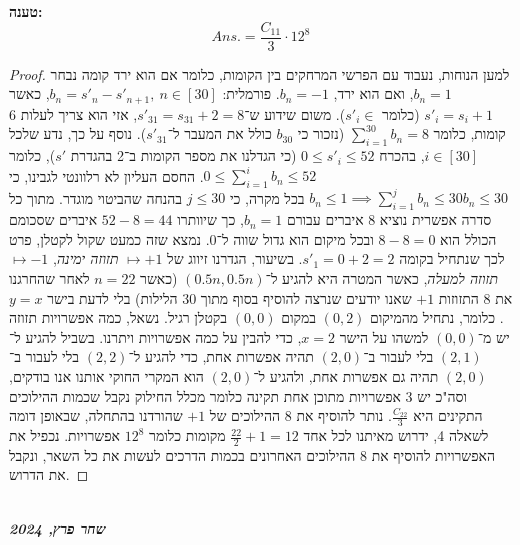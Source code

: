 \documentclass[]{article}
\newcommand\ndoc  {\dotfill \\ \vfil \hfil \textbf{\textit{שחר פרץ, 2024}} \hfil \vfil}
\newcommand\ans   {\mathit{Ans.}}
\begin{document}
	\textbf{טענה: }
	\[ \ans = \frac{C_{11}}{3} \cdot 12^{8} \]
	\begin{proof}
		למען הנוחות, נעבוד עם הפרשי המרחקים בין הקומות, כלומר אם הוא ירד קומה נבחר $b_n = 1$, ואם הוא ירד, $b_n = -1$. פורמלית: $b_n = s'_n - s'_{n + 1}, \ n \in [30]$, כאשר $s'_i = s_i + 1$ (כלומר $s'_i \in $). משום שידוע ש־$s'_{31} = s_{31} + 2 = 8$, אזי הוא צריך לעלות 6 קומות, כלומר $\sum_{i = 1}^{30} b_n = 8$ (נזכור כי $b_{30}$ כולל את המעבר ל־$s'_{31}$). נוסף על כך, נדע שלכל $i \in [30]$, בהכרח $0 \le s'_i \le 52$ (כי הגדלנו את מספר הקומות ב־2 בהגדרת $s'$), כלומר $0 \le \sum_{i = 1}^{i} b_n\le 52$. החסם העליון לא רלוונטי לגבינו, כי $b_n \le 1 \implies \sum_{i = 1}^{j} b_n \le 30 b_n \le 30$ בכל מקרה, כי $j \le 30$ בהנחה שהביטוי מוגדר. מתוך כל סדרה אפשרית נוציא $8$ איברים עבורם $b_n = 1$, כך שיוותרו $52 - 8 = 44$ איברים שסכומם הכולל הוא $8 - 8 = 0$ ובכל מיקום הוא גדול שווה ל־$0$. נמצא שזה כמעט שקול לקטלן, פרט לכך שנתחיל בקומה $s'_1 = 0 + 2 = 2$. בשיעור, הגדרנו זיווג של $\mapsto + 1$ \textit{תזוזה ימינה}, $\mapsto -1$ \textit{תזוזה למעלה}, כאשר המטרה היא להגיע ל־$(0.5n, 0.5n)$ (כאשר $n = 22$ לאחר שהחרגנו את $8$ התזוזות $+1$ שאנו יודעים שנרצה להוסיף בסוף מתוך $30$ הלילות) בלי לדעת בישר $y = x$. כלומר, נתחיל מהמיקום $(0, 2)$ במקום $(0, 0)$ בקטלן רגיל. נשאל, כמה אפשרויות תזוזה יש מ־$(0, 0)$ למשהו על הישר $x = 2$, כדי להבין על כמה אפשרויות ויתרנו. בשביל להגיע ל־$(2, 1)$ בלי לעבור ב־$(2, 0)$ תהיה אפשרות אחת, כדי להגיע ל־$(2, 2)$ בלי לעבור ב־$(2, 0)$ תהיה גם אפשרות אחת, ולהגיע ל־$(2, 0)$ הוא המקרי החוקי אותנו אנו בודקים, וסה"כ יש 3 אפשרויות מתוכן אחת תקינה כלומר מכלל החילוק נקבל שכמות ההילוכים התקינים היא $\frac{C_{22}}{3}$. נותר להוסיף את $8$ ההילוכים של $+ 1$ שהורדנו בהתחלה, שבאופן דומה לשאלה 4, ידרוש מאיתנו לכל אחד $\frac{22}{2} + 1 = 12$ מקומות כלומר $12^{8}$ אפשרויות. נכפיל את האפשרויות להוסיף את $8$ ההילוכים האחרונים בכמות הדרכים לעשות את כל השאר, ונקבל את הדרוש. 
	\end{proof}
	
	\ndoc
\end{document}
